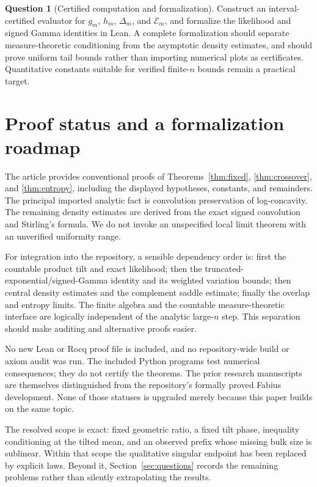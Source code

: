 \documentclass[11pt,a4paper]{article}
\numberwithin{equation}{section}
\theoremstyle{definition}
\newtheorem{question}{Question}
\theoremstyle{remark}
\begin{document}
\begin{question}[Certified computation and formalization]
Construct an interval-certified evaluator for $g_m$, $h_m$,
$\Delta_m$, and $\mathscr E_m$, and formalize the likelihood and signed
Gamma identities in Lean. A complete formalization should separate
measure-theoretic conditioning from the asymptotic density estimates,
and should prove uniform tail bounds rather than importing numerical
plots as certificates. Quantitative constants suitable for verified
finite-$n$ bounds remain a practical target.
\end{question}

\section{Proof status and a formalization roadmap}
\label{sec:status}

The article provides conventional proofs of
Theorems~\ref{thm:fixed}, \ref{thm:crossover}, and \ref{thm:entropy},
including the displayed hypotheses, constants, and remainders. The
principal imported analytic fact is convolution preservation of
log-concavity. The remaining density estimates are derived from the
exact signed convolution and Stirling's formula. We do not invoke an
unspecified local limit theorem with an unverified uniformity range.

For integration into the repository, a sensible dependency order is:
first the countable product tilt and exact likelihood; then the
truncated-exponential/signed-Gamma identity and its weighted variation
bounds; then central density estimates and the complement saddle
estimate; finally the overlap and entropy limits. The finite algebra
and the countable measure-theoretic interface are logically independent
of the analytic large-$n$ step. This separation should make auditing
and alternative proofs easier.

No new Lean or Rocq proof file is included, and no repository-wide build
or axiom audit was run. The included Python programs test numerical
consequences; they do not certify the theorems. The prior research
manuscripts are themselves distinguished from the repository's formally
proved Fabius development. None of those statuses is upgraded merely
because this paper builds on the same topic.

The resolved scope is exact: fixed geometric ratio, a fixed tilt phase,
inequality conditioning at the tilted mean, and an observed prefix
whose missing bulk size is sublinear. Within that scope the qualitative
singular endpoint has been replaced by explicit laws. Beyond it,
Section~\ref{sec:questions} records the remaining problems rather than
silently extrapolating the results.
\end{document}

